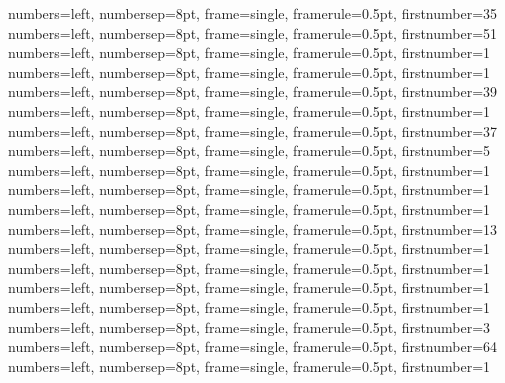 {numbers=left, numbersep=8pt, frame=single, framerule=0.5pt, firstnumber=35}
{numbers=left, numbersep=8pt, frame=single, framerule=0.5pt, firstnumber=51}
{numbers=left, numbersep=8pt, frame=single, framerule=0.5pt, firstnumber=1}
{numbers=left, numbersep=8pt, frame=single, framerule=0.5pt, firstnumber=1}
{numbers=left, numbersep=8pt, frame=single, framerule=0.5pt, firstnumber=39}
{numbers=left, numbersep=8pt, frame=single, framerule=0.5pt, firstnumber=1}
{numbers=left, numbersep=8pt, frame=single, framerule=0.5pt, firstnumber=37}
{numbers=left, numbersep=8pt, frame=single, framerule=0.5pt, firstnumber=5}
{numbers=left, numbersep=8pt, frame=single, framerule=0.5pt, firstnumber=1}
{numbers=left, numbersep=8pt, frame=single, framerule=0.5pt, firstnumber=1}
{numbers=left, numbersep=8pt, frame=single, framerule=0.5pt, firstnumber=1}
{numbers=left, numbersep=8pt, frame=single, framerule=0.5pt, firstnumber=13}
{numbers=left, numbersep=8pt, frame=single, framerule=0.5pt, firstnumber=1}
{numbers=left, numbersep=8pt, frame=single, framerule=0.5pt, firstnumber=1}
{numbers=left, numbersep=8pt, frame=single, framerule=0.5pt, firstnumber=1}
{numbers=left, numbersep=8pt, frame=single, framerule=0.5pt, firstnumber=1}
{numbers=left, numbersep=8pt, frame=single, framerule=0.5pt, firstnumber=3}
{numbers=left, numbersep=8pt, frame=single, framerule=0.5pt, firstnumber=64}
{numbers=left, numbersep=8pt, frame=single, framerule=0.5pt, firstnumber=1}